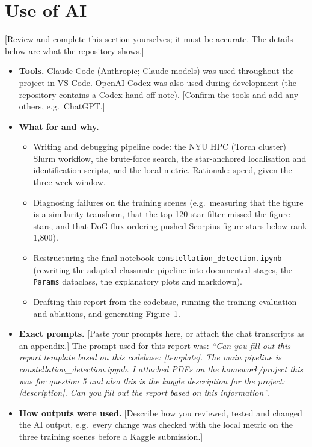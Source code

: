 \documentclass[a4paper,11pt]{article}
\newcommand{\fillin}[1]{{\color{red}[#1]}}
\begin{document}
\section{Use of AI}

\fillin{Review and complete this section yourselves; it must be accurate. The details below are what the repository shows.}

\begin{itemize}
\item \textbf{Tools.} Claude Code (Anthropic; Claude models) was used throughout the project in VS Code. OpenAI Codex was
also used during development (the repository contains a Codex hand-off note). \fillin{Confirm the tools and add any
others, e.g.\ ChatGPT.}
\item \textbf{What for and why.}
  \begin{itemize}
  \item Writing and debugging pipeline code: the NYU HPC (Torch cluster) Slurm workflow, the brute-force search, the
  star-anchored localisation and identification scripts, and the local metric. Rationale: speed, given the
  three-week window.
  \item Diagnosing failures on the training scenes (e.g.\ measuring that the figure is a similarity transform, that
  the top-120 star filter missed the figure stars, and that DoG-flux ordering pushed Scorpius figure stars below rank
  1,800).
  \item Restructuring the final notebook \texttt{constellation\_detection.ipynb} (rewriting the adapted classmate
  pipeline into documented stages, the \texttt{Params} dataclass, the explanatory plots and markdown).
  \item Drafting this report from the codebase, running the training evaluation and ablations, and generating
  Figure~1.
  \end{itemize}
\item \textbf{Exact prompts.} \fillin{Paste your prompts here, or attach the chat transcripts as an appendix.} The prompt
used for this report was: \emph{``Can you fill out this report template based on this codebase: [template]. The main
pipeline is constellation\_detection.ipynb. I attached PDFs on the homework/project this was for question 5 and also this is
the kaggle description for the project: [description]. Can you fill out the report based on this information''}.
\item \textbf{How outputs were used.} \fillin{Describe how you reviewed, tested and changed the AI output, e.g.\ every
change was checked with the local metric on the three training scenes before a Kaggle submission.}
\end{itemize}
\end{document}
